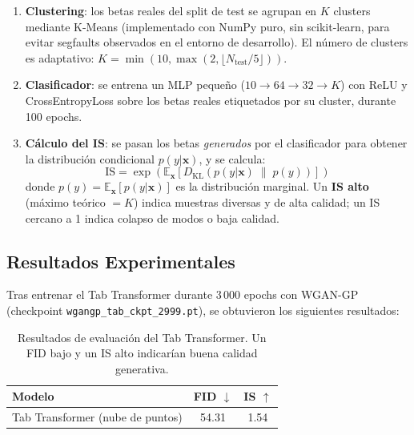 \documentclass[a4paper,11pt]{article}
\begin{document}
\begin{enumerate}
    \item \textbf{Clustering}: los betas reales del split de test se
          agrupan en $K$ clusters mediante K-Means (implementado con
          NumPy puro, sin scikit-learn, para evitar segfaults observados
          en el entorno de desarrollo). El número de clusters es adaptativo:
          $K = \min(10, \max(2, \lfloor N_{\text{test}} / 5 \rfloor))$.

    \item \textbf{Clasificador}: se entrena un MLP pequeño
          ($10 \to 64 \to 32 \to K$) con ReLU y CrossEntropyLoss sobre
          los betas reales etiquetados por su cluster, durante 100 epochs.

    \item \textbf{Cálculo del IS}: se pasan los betas \emph{generados}
          por el clasificador para obtener la distribución condicional
          $p(y|\bm{x})$, y se calcula:
          \begin{equation}
              \label{eq:is}
              \text{IS} = \exp\!\left(\mathbb{E}_{\bm{x}}\left[
              D_{\text{KL}}\!\left(p(y|\bm{x})\;\|\;p(y)\right)
              \right]\right)
          \end{equation}
          donde $p(y) = \mathbb{E}_{\bm{x}}[p(y|\bm{x})]$ es la distribución
          marginal. Un \textbf{IS alto} (máximo teórico $= K$) indica muestras
          diversas y de alta calidad; un IS cercano a 1 indica colapso de
          modos o baja calidad.
\end{enumerate}

\subsection{Resultados Experimentales}

Tras entrenar el Tab Transformer durante 3\,000 epochs con WGAN-GP
(checkpoint \texttt{wgangp\_tab\_ckpt\_2999.pt}), se obtuvieron los
siguientes resultados:

\begin{table}[H]
    \centering
    \caption{Resultados de evaluación del Tab Transformer. Un FID bajo y un IS
             alto indicarían buena calidad generativa.}
    \label{tab:tab_results}
    \begin{tabular}{@{}lcc@{}}
        \toprule
        \textbf{Modelo} & \textbf{FID} $\downarrow$ & \textbf{IS} $\uparrow$ \\
        \midrule
        Tab Transformer (nube de puntos) & 54.31 & 1.54 \\
        \bottomrule
    \end{tabular}
\end{table}
\end{document}
